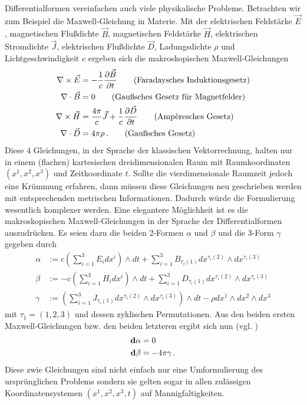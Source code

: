 Differentialformen vereinfachen auch viele physikalische Probleme. 
Betrachten wir zum Beispiel die Maxwell-Gleichung in Materie.
Mit der elektrischen Feldstärke \( \vec{E} \), magnetischen Flußdichte \( \vec{B} \), magnetischen Feldstärke \( \vec{H} \), elektrischen Stromdichte \( \vec{J} \),
elektrischen Flußdichte \( \vec{D} \), Ladungsdichte \( \rho \) und Lichtgeschwindigkeit \( c \)
ergeben sich die makroskopischen Maxwell-Gleichungen 
\begin{align}
  \nabla \times \vec{E} &= - \frac{1}{c} \frac{\partial \vec{B}}{\partial t} \tag{Faradaysches Induktionsgesetz} \\
  \nabla \cdot \vec{B} &= 0 \tag{Gaußsches Gesetz für Magnetfelder}\\
  \nabla \times \vec{H} &= \frac{4\pi}{c} \vec{J} + \frac{1}{c} \frac{\partial\vec{D}}{\partial t}  \tag{Amp\`{e}resches Gesetz}\\
  \nabla \cdot \vec{D} &= 4 \pi \rho \formpunkt \tag{Gaußsches Gesetz}
\end{align}
Diese 4 Gleichungen, in der Sprache der klassischen Vektorrechnung, halten nur in einem (flachen) kartesischen dreidimensionalen Raum mit Raumkoordinaten 
\( \left( x^{1}, x^{2}, x^{3} \right) \) und Zeitkoordinate \( t \).
Sollte die vierdimensionale Raumzeit jedoch eine Krümmung erfahren, dann müssen diese Gleichungen neu geschrieben werden mit entsprechenden metrischen Informationen.
Dadurch würde die Formulierung wesentlich komplexer werden. 
Eine elegantere Möglichkeit ist es die makroskopischen Maxwell-Gleichungen in der Sprache der Differentialformen auszudrücken. 
Es seien dazu die beiden 2-Formen \( \alpha \) und \( \beta \)
und die 3-Form \( \gamma \) gegeben durch
\begin{align}
    \alpha &:= c \left( \sum_{i=1}^{3} E_{i}dx^{i}\right) \wedge dt 
                + \sum_{i=1}^{3} B_{\tau_{i}(1)} dx^{\tau_{i}(2)}\wedge dx^{\tau_{i}(3)}\\
    \beta &:=  - c \left( \sum_{i=1}^{3} H_{i}dx^{i}\right) \wedge dt
                + \sum_{i=1}^{3} D_{\tau_{i}(1)} dx^{\tau_{i}(2)}\wedge dx^{\tau_{i}(3)} \\
    \gamma &:= \left( \sum_{i=1}^{3} J_{\tau_{i}(1)} dx^{\tau_{i}(2)}\wedge dx^{\tau_{i}(3)} \right) \wedge dt
                - \rho dx^{1} \wedge dx^{2} \wedge dx^{3}
\end{align}
mit \( \tau_{1}=\left( 1,2,3 \right) \) und dessen zyklischen Permutationen.
Aus den beiden ersten Maxwell-Gleichungen bzw. den beiden letzteren ergibt sich nun (vgl. \cite[4.6]{flanders})
\begin{align}
  \begin{aligned}
    \mathbf{d}\alpha &= 0 \\
    \mathbf{d}\beta  &= -4\pi\gamma  \,\text{.}
  \end{aligned}
\end{align}
Diese zwie Gleichungen sind nicht einfach nur eine Umformulierung des ursprünglichen Problems 
sondern sie gelten sogar in allen zulässigen Koordinatensystemen \( \left( x^{1}, x^{2}, x^{3}, t  \right) \) auf Mannigfaltigkeiten.

